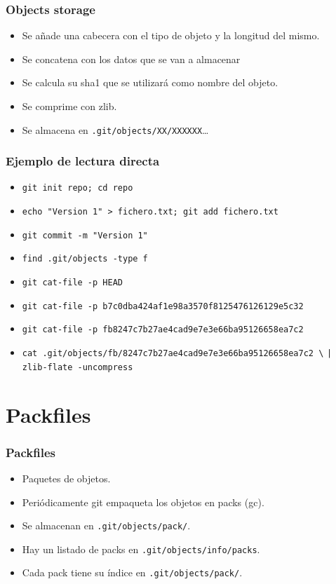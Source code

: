 \documentclass[10pt]{beamer}
\begin{document}
  \begin{frame}[containsverbatim]
    \frametitle{Objects storage}
    \begin{itemize}
        \item Se añade una cabecera con el tipo de objeto y la longitud del mismo.
        \item Se concatena con los datos que se van a almacenar
        \item Se calcula su sha1 que se utilizará como nombre del objeto.
        \item Se comprime con zlib.
        \item Se almacena en \verb$.git/objects/XX/XXXXXX$\dots{}
    \end{itemize}
  \end{frame}

  \begin{frame}[containsverbatim]
    \frametitle{Ejemplo de lectura directa}
    \begin{itemize}
        \item \verb$git init repo; cd repo$
        \item \verb$echo "Version 1" > fichero.txt; git add fichero.txt$
        \item \verb$git commit -m "Version 1"$
        \item \verb$find .git/objects -type f$
        \item \verb$git cat-file -p HEAD$
        \item \verb$git cat-file -p b7c0dba424af1e98a3570f8125476126129e5c32$
        \item \verb$git cat-file -p fb8247c7b27ae4cad9e7e3e66ba95126658ea7c2$
        \item \verb$cat .git/objects/fb/8247c7b27ae4cad9e7e3e66ba95126658ea7c2 \$ \verb$| zlib-flate -uncompress$
    \end{itemize}
  \end{frame}

  \section*{Packfiles}

  \begin{frame}[containsverbatim]
    \frametitle{Packfiles}
    \begin{itemize}
        \item Paquetes de objetos.
        \item Periódicamente git empaqueta los objetos en packs (gc).
        \item Se almacenan en \verb$.git/objects/pack/$.
        \item Hay un listado de packs en \verb$.git/objects/info/packs$.
        \item Cada pack tiene su índice en \verb$.git/objects/pack/$.
    \end{itemize}
  \end{frame}
\end{document}
